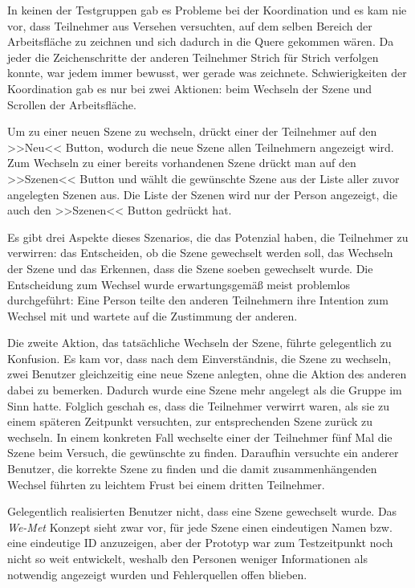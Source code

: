 \medskip In keinen der Testgruppen gab es Probleme bei der Koordination und es kam nie vor, dass Teilnehmer aus Versehen versuchten, auf dem selben Bereich der Arbeitsfläche zu zeichnen und sich dadurch in die Quere gekommen wären. Da jeder die Zeichenschritte der anderen Teilnehmer Strich für Strich verfolgen konnte, war jedem immer bewusst, wer gerade was zeichnete. Schwierigkeiten der Koordination gab es nur bei zwei Aktionen: beim Wechseln der Szene und Scrollen der Arbeitsfläche.
	
\medskip Um zu einer neuen Szene zu wechseln, drückt einer der Teilnehmer auf den >>Neu<< Button, wodurch die neue Szene allen Teilnehmern angezeigt wird. Zum Wechseln zu einer bereits vorhandenen Szene drückt man auf den >>Szenen<< Button und wählt die gewünschte Szene aus der Liste aller zuvor angelegten Szenen aus. Die Liste der Szenen wird nur der Person angezeigt, die auch den >>Szenen<< Button gedrückt hat.
	
\medskip Es gibt drei Aspekte dieses Szenarios, die das Potenzial haben, die Teilnehmer zu verwirren: das Entscheiden, ob die Szene gewechselt werden soll, das Wechseln der Szene und das Erkennen, dass die Szene soeben gewechselt wurde. Die Entscheidung zum Wechsel wurde erwartungsgemäß meist problemlos durchgeführt: Eine Person teilte den anderen Teilnehmern ihre Intention zum Wechsel mit und wartete auf die Zustimmung der anderen.
	
\medskip Die zweite Aktion, das tatsächliche Wechseln der Szene, führte gelegentlich zu Konfusion. Es kam vor, dass nach dem Einverständnis, die Szene zu wechseln, zwei Benutzer gleichzeitig eine neue Szene anlegten, ohne die Aktion des anderen dabei zu bemerken. Dadurch wurde eine Szene mehr angelegt als die Gruppe im Sinn hatte. Folglich geschah es, dass die Teilnehmer verwirrt waren, als sie zu einem späteren Zeitpunkt versuchten, zur entsprechenden Szene zurück zu wechseln. In einem konkreten Fall wechselte einer der Teilnehmer fünf Mal die Szene beim Versuch, die gewünschte zu finden. Daraufhin versuchte ein anderer Benutzer, die korrekte Szene zu finden und die damit zusammenhängenden Wechsel führten zu leichtem Frust bei einem dritten Teilnehmer.
	
\medskip Gelegentlich realisierten Benutzer nicht, dass eine Szene gewechselt wurde. Das \emph{We-Met} Konzept sieht zwar vor, für jede Szene einen eindeutigen Namen bzw. eine eindeutige ID anzuzeigen, aber der Prototyp war zum Testzeitpunkt noch nicht so weit entwickelt, weshalb den Personen weniger Informationen als notwendig angezeigt wurden und Fehlerquellen offen blieben.
	
